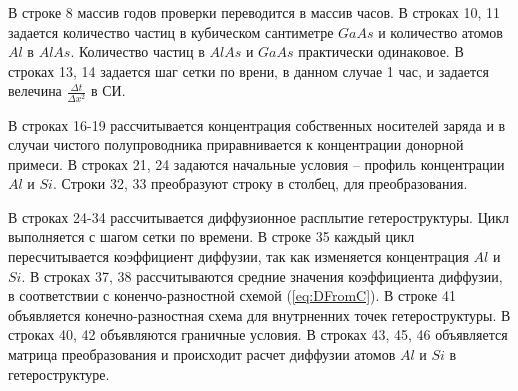 В строке 8 массив годов проверки переводится в массив часов. В строках 10, 11 задается количество частиц в кубическом сантиметре $GaAs$ и количество атомов $Al$ в $AlAs$. Количество частиц в $AlAs$ и $GaAs$ практически одинаковое. В строках 13, 14 задается шаг сетки по врени, в данном случае 1 час, и задается велечина $\frac{\Delta t}{\Delta x^{2}}$ в СИ.

В строках 16-19 рассчитывается концентрация собственных носителей заряда и в случаи чистого полупроводника приравнивается к концентрации донорной примеси. В строках 21, 24 задаются начальные условия -- профиль концентрации $Al$ и $Si$. Строки 32, 33 преобразуют строку в столбец, для преобразования. 

В строках 24-34 рассчитывается диффузионное расплытие гетероструктуры. Цикл выполняется с шагом сетки по времени. В строке 35 каждый цикл пересчитывается коэффициент диффузии, так как изменяется концентрация $Al$ и $Si$. В строках 37, 38 рассчитываются средние значения коэффициента диффузии, в соответствии с коненчо-разностной схемой (\ref{eq:DFromC}). В строке 41 объявляется конечно-разностная схема для внутрненних точек гетероструктуры. В строках 40, 42 объявляются граничные условия. В строках 43, 45, 46 объявляется матрица преобразования и происходит расчет диффузии атомов $Al$ и $Si$ в гетероструктуре.
